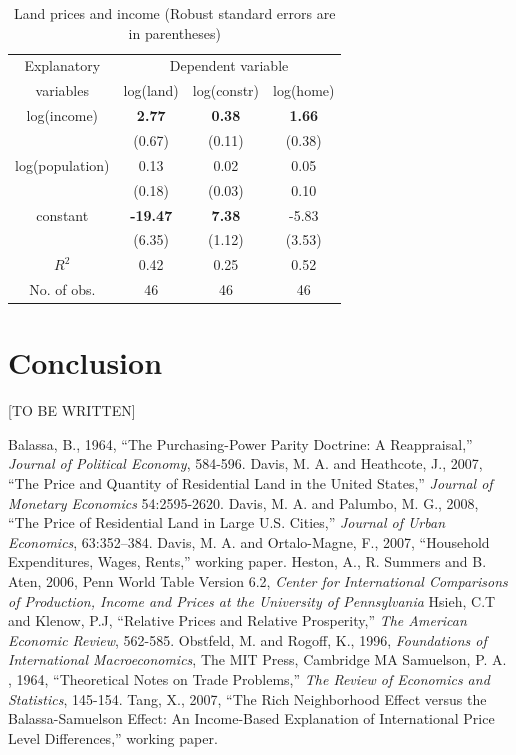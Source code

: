 \documentclass[12pt]{article}
\begin{document}
\begin{table}[h!]
\center \caption{Land prices and income (Robust standard errors are
in parentheses)} \label{tab:land}
\begin{tabular}{c|ccc}
  \hline\hline
  Explanatory & \multicolumn{3}{c}{Dependent variable} \\
  variables & log(land) & log(constr) & log(home) \\ \hline
  log(income)    & \textbf{2.77}   & \textbf{0.38}  & \textbf{1.66}\\
                 & (0.67)          & (0.11)         &  (0.38)\\
  log(population)& 0.13            &  0.02          &  0.05\\
                 & (0.18)          & (0.03)         &  0.10\\
  constant       & \textbf{-19.47} & \textbf{7.38}  &  -5.83\\
                 & (6.35)          & (1.12)         &  (3.53)\\ \hline
  $R^2$          & 0.42            & 0.25           &   0.52\\
  No. of obs.    & 46              & 46             &   46   \\ \hline\hline
\end{tabular}
\end{table}

\section{Conclusion}
[TO BE WRITTEN]

\begin{thebibliography}{99}
 Balassa, B., 1964, ``The Purchasing-Power Parity Doctrine: A
Reappraisal,'' \emph{Journal of Political Economy}, 584-596.
 Davis, M. A. and Heathcote, J., 2007, ``The Price and Quantity of Residential Land in the United States,'' \emph{Journal of Monetary Economics} 54:2595-2620.
 Davis, M. A. and Palumbo, M. G., 2008, ``The Price
of Residential Land in Large U.S. Cities,'' \emph{Journal of Urban Economics}, 63:352--384.
\bibitem{} Davis, M. A. and Ortalo-Magne, F., 2007, ``Household Expenditures, Wages, Rents,'' working paper.
 Heston, A., R. Summers and B. Aten, 2006, Penn World Table Version 6.2, \emph{Center for International Comparisons of Production, Income and Prices at the University of
Pennsylvania}
 Hsieh, C.T and Klenow, P.J, ``Relative Prices and
Relative Prosperity,'' \emph{The American Economic Review}, 562-585.
     Obstfeld, M. and Rogoff, K., 1996, \emph{Foundations of International
Macroeconomics}, The MIT Press, Cambridge MA
     Samuelson, P. A. , 1964, ``Theoretical Notes on Trade
Problems,'' \emph{The Review of Economics and Statistics}, 145-154.
    \bibitem{} Tang, X., 2007, ``The Rich Neighborhood Effect versus the Balassa-Samuelson Effect: An Income-Based Explanation of International Price Level Differences,'' working paper.
\end{thebibliography}
\end{document}
